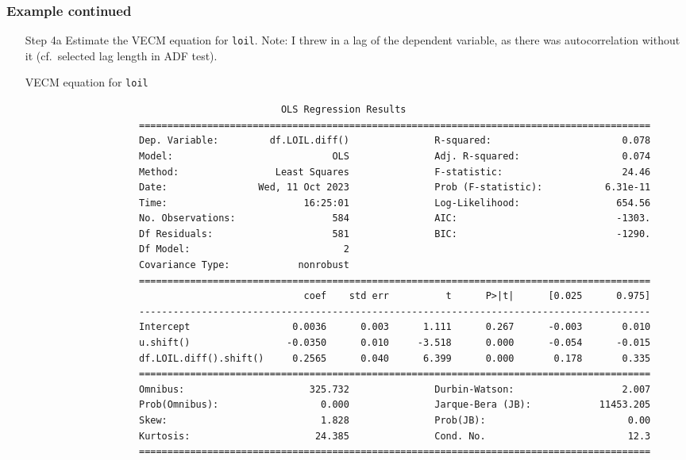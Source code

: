 \begin{frame}[fragile]\frametitle{Example continued}
\begin{itemize}
\item[Step 4a] Estimate the VECM equation for \texttt{loil}. Note: I threw in a lag of the dependent variable, as there was autocorrelation without it (cf.\ selected lag length in ADF test).
\begin{block}{VECM equation for \texttt{loil}}
	\tiny
\begin{verbatim}
                                             OLS Regression Results
                    ==========================================================================================
                    Dep. Variable:         df.LOIL.diff()               R-squared:                       0.078
                    Model:                            OLS               Adj. R-squared:                  0.074
                    Method:                 Least Squares               F-statistic:                     24.46
                    Date:                Wed, 11 Oct 2023               Prob (F-statistic):           6.31e-11
                    Time:                        16:25:01               Log-Likelihood:                 654.56
                    No. Observations:                 584               AIC:                            -1303.
                    Df Residuals:                     581               BIC:                            -1290.
                    Df Model:                           2
                    Covariance Type:            nonrobust
                    ==========================================================================================
                                                 coef    std err          t      P>|t|      [0.025      0.975]
                    ------------------------------------------------------------------------------------------
                    Intercept                  0.0036      0.003      1.111      0.267      -0.003       0.010
                    u.shift()                 -0.0350      0.010     -3.518      0.000      -0.054      -0.015
                    df.LOIL.diff().shift()     0.2565      0.040      6.399      0.000       0.178       0.335
                    ==========================================================================================
                    Omnibus:                      325.732               Durbin-Watson:                   2.007
                    Prob(Omnibus):                  0.000               Jarque-Bera (JB):            11453.205
                    Skew:                           1.828               Prob(JB):                         0.00
                    Kurtosis:                      24.385               Cond. No.                         12.3
                    ==========================================================================================

\end{verbatim}
\end{block}
\end{itemize}
\end{frame}
